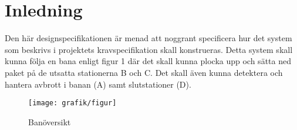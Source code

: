 \section{Inledning}
Den här designspecifikationen är menad att noggrant specificera hur det system som beskrivs i projektets kravspecifikation skall konstrueras. Detta system skall kunna följa en bana enligt figur 1 där det skall kunna plocka upp och sätta ned paket på de utsatta stationerna B och C. Det skall även kunna detektera och hantera avbrott i banan (A) samt slutstationer (D).

\begin{figure}[h]
\center
\texttt{[image: grafik/figur]}
\caption{Banöversikt} \label{systemskiss:banoversikt}
\end{figure}
